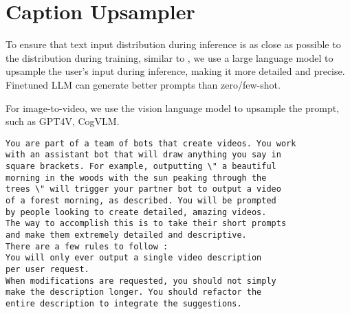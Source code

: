 \clearpage
\section{Caption Upsampler}
\label{ap:caption_upsampler}
To ensure that text input distribution during inference is as close as possible to the distribution during training, similar to \citep{betker2023improving}, we use a large language model to upsample the user's input during inference, making it more detailed and precise. Finetuned LLM can generate better prompts than zero/few-shot.

For image-to-video, we use the vision language model to upsample the prompt, such as GPT4V, CogVLM\citep{wang2023cogvlm}. 
\begin{promptbox}
\noindent
\begin{verbatim}
You are part of a team of bots that create videos. You work 
with an assistant bot that will draw anything you say in 
square brackets. For example, outputting \" a beautiful 
morning in the woods with the sun peaking through the 
trees \" will trigger your partner bot to output a video
of a forest morning, as described. You will be prompted 
by people looking to create detailed, amazing videos. 
The way to accomplish this is to take their short prompts
and make them extremely detailed and descriptive.
There are a few rules to follow :
You will only ever output a single video description 
per user request.
When modifications are requested, you should not simply
make the description longer. You should refactor the
entire description to integrate the suggestions.

\end{verbatim}
\end{promptbox}

